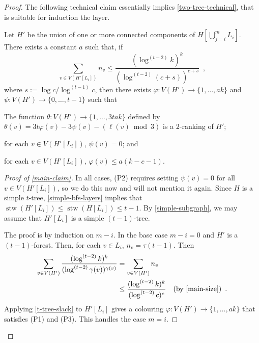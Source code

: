\documentclass[kpfonts]{patmorin}
\DeclareMathOperator{\stw}{stw}
\theoremstyle{named}
\begin{document}
\begin{proof}
    The following technical claim essentially implies \cref{two-tree-technical}, that is suitable for induction the layer.

    \begin{clm}\label{main-claim}
        Let $H'$ be the union of one or more connected components of $H[\bigcup_{j=i}^m L_i]$. There exists a constant $a$ such that, if
        \begin{equation}
            \sum_{v\in V(H'[L_i])} n_v\le \frac{(\log^{(t-2)} k)^{k}}{(\log^{(t-2)} (c+s))^{c+s}} \enspace , \label{main-size}
        \end{equation}
        where $s:=\log c/\log^{(t-1)} c$,
        then there exists $\varphi:V(H')\to\{1,\ldots,ak\}$ and $\psi:V(H')\to\{0,\ldots,t-1\}$ such that
        \begin{compactenum}[(P1)]
            \item The function $\theta:V(H')\to\{1,\ldots,3tak\}$ defined by $\theta(v)=3t\varphi(v) - 3\psi(v) -(\ell(v)\bmod 3)$ is a 2-ranking of $H'$;
            \item for each $v\in V(H'[L_i])$, $\psi(v)=0$; and
            \item for each $v\in V(H'[L_i])$, $\varphi(v)\le a(k-c-1)$.
        \end{compactenum}
    \end{clm}

    \begin{proof}[Proof of \cref{main-claim}]
        In all cases, (P2) requires setting $\psi(v)=0$ for all $v\in V(H'[L_i])$, so we do this now and will not mention it again.  Since $H$ is a simple $t$-tree, \cref{simple-bfs-layers} implies that $\stw(H'[L_i])\le \stw(H[L_i])\le t-1$.  By \cref{simple-subgraph}, we may assume that $H'[L_i]$ is a simple $(t-1)$-tree.

        The proof is by induction on $m-i$. In the base case $m-i=0$ and $H'$ is a $(t-1)$-forest.  Then, for each $v\in L_i$, $n_v=\tau(t-1)$.  Then
        \begin{align*}
            \sum_{v\in V(H')} \frac{(\log^{(t-2)} k)^k}{(\log^{(t-2)} \gamma(v))^{\gamma(v)}}
            & = \sum_{v\in V(H')} n_v \\
            & \le \frac{(\log^{(t-2)} k)^{k}}{(\log^{(t-2)} c)^c} & \text{(by \cref{main-size})} \enspace .
        \end{align*}
        Applying \cref{t-tree-slack} to $H'[L_i]$ gives a colouring $\varphi: V(H')\to\{1,\ldots,ak\}$ that satisfies (P1) and (P3).  This handles the case $m=i$.


\end{proof}
\end{proof}
\end{document}
